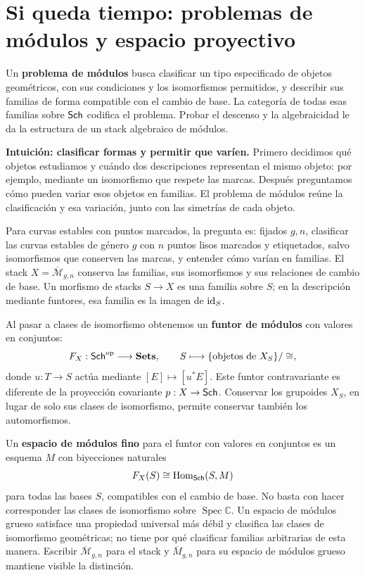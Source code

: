 \documentclass[12pt,openany]{memoir}
\begin{document}
\section{Si queda tiempo: problemas de módulos y espacio proyectivo}
\label{sec:moduli}

Un \textbf{problema de módulos} busca clasificar un tipo especificado de
objetos geométricos, con sus condiciones y los isomorfismos permitidos,
y describir sus familias de forma compatible con el cambio de base.
La categoría de todas esas familias sobre \(\mathsf{Sch}\) codifica el problema.
Probar el descenso y la algebraicidad le da la estructura de un stack
algebraico de módulos.

\begin{ptcb}
\textbf{Intuición: clasificar formas y permitir que varíen.}
Primero decidimos qué objetos estudiamos y cuándo dos descripciones
representan el mismo objeto: por ejemplo, mediante un isomorfismo que
respete las marcas. Después preguntamos cómo pueden variar esos objetos
en familias. El problema de módulos reúne la clasificación y esa variación,
junto con las simetrías de cada objeto.
\end{ptcb}

Para curvas estables con puntos marcados, la pregunta es: fijados \(g,n\),
clasificar las curvas estables de género \(g\) con \(n\) puntos lisos
marcados y etiquetados, salvo isomorfismos que conserven las marcas,
y entender cómo varían en familias.
El stack \(X=\overline{\mathcal M}_{g,n}\) conserva las familias, sus
isomorfismos y sus relaciones de cambio de base. Un morfismo de stacks
\(S\to X\) es una familia sobre \(S\); en la descripción mediante
funtores, esa familia es la imagen de \(\operatorname{id}_S\).

Al pasar a clases de isomorfismo obtenemos un \textbf{funtor de módulos}
con valores en conjuntos:
\[
 F_X:\mathsf{Sch}^{\mathrm{op}}\longrightarrow\mathbf{Sets},
 \qquad S\longmapsto\{\text{objetos de }X_S\}/\cong,
\]
donde \(u:T\to S\) actúa mediante \([E]\mapsto[u^*E]\).
Este funtor contravariante es diferente de la proyección covariante
\(p:X\to\mathsf{Sch}\). Conservar los grupoides \(X_S\), en lugar de solo sus
clases de isomorfismo, permite conservar también los automorfismos.

Un \textbf{espacio de módulos fino} para el funtor con valores en conjuntos
es un esquema \(M\) con biyecciones naturales
\[
 F_X(S)\cong\operatorname{Hom}_{\mathsf{Sch}}(S,M)
\]
para todas las bases \(S\), compatibles con el cambio de base. No basta con
hacer corresponder las clases de isomorfismo sobre
\(\operatorname{Spec}\mathbb C\). Un espacio de módulos grueso satisface
una propiedad universal más débil y clasifica las clases de isomorfismo
geométricas; no tiene por qué clasificar familias arbitrarias de esta
manera. Escribir \(\overline{\mathcal M}_{g,n}\) para el stack y
\(\overline M_{g,n}\) para su espacio de módulos grueso mantiene visible
la distinción.
\end{document}
